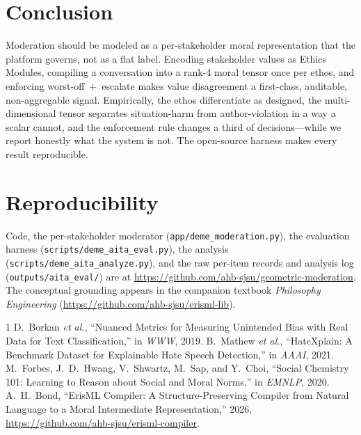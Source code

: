 \documentclass[journal]{IEEEtran}
\begin{document}
\section{Conclusion}
Moderation should be modeled as a per-stakeholder moral representation that the
platform governs, not as a flat label. Encoding stakeholder values as Ethics
Modules, compiling a conversation into a rank-4 moral tensor once per ethos, and
enforcing worst-off~$+$~escalate makes value disagreement a first-class,
auditable, non-aggregable signal. Empirically, the ethos differentiate as
designed, the multi-dimensional tensor separates situation-harm from
author-violation in a way a scalar cannot, and the enforcement rule changes a
third of decisions---while we report honestly what the system is not. The
open-source harness makes every result reproducible.

\section*{Reproducibility}
Code, the per-stakeholder moderator (\texttt{app/deme\_moderation.py}), the
evaluation harness (\texttt{scripts/deme\_aita\_eval.py}), the analysis
(\texttt{scripts/deme\_aita\_analyze.py}), and the raw per-item records and
analysis log (\texttt{outputs/aita\_eval/}) are at
\url{https://github.com/ahb-sjsu/geometric-moderation}. The conceptual grounding
appears in the companion textbook \emph{Philosophy Engineering}
(\url{https://github.com/ahb-sjsu/erisml-lib}).

\begin{thebibliography}{1}
 D.~Borkan \emph{et al.}, ``Nuanced Metrics for Measuring
Unintended Bias with Real Data for Text Classification,'' in \emph{WWW}, 2019.
 B.~Mathew \emph{et al.}, ``HateXplain: A Benchmark Dataset
for Explainable Hate Speech Detection,'' in \emph{AAAI}, 2021.
 M.~Forbes, J.~D.~Hwang, V.~Shwartz, M.~Sap, and Y.~Choi,
``Social Chemistry 101: Learning to Reason about Social and Moral Norms,'' in
\emph{EMNLP}, 2020.
 A.~H.~Bond, ``ErisML Compiler: A Structure-Preserving Compiler
from Natural Language to a Moral Intermediate Representation,'' 2026,
\url{https://github.com/ahb-sjsu/erisml-compiler}.
\end{thebibliography}
\end{document}
